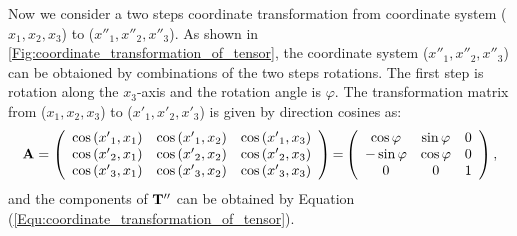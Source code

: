 Now we consider a two steps coordinate transformation from coordinate system ($x_1,x_2,x_3$) to ($x''_1,x''_2,x''_3$). As shown in \ref{Fig:coordinate_transformation_of_tensor}, the coordinate system ($x''_1,x''_2,x''_3$) can be obtaioned by combinations of the two steps rotations. The first step is rotation along the $x_3$-axis and the rotation angle is $\varphi$. The transformation matrix from ($x_1,x_2,x_3$) to ($x'_1,x'_2,x'_3$) is given by direction cosines as:
\begin{eqnarray}
{\bf{A}} = \left( {\begin{array}{*{20}{c}}
{\cos \left( {{{x'}_1},{x_1}} \right)}&{\cos \left( {{{x'}_1},{x_2}} \right)}&{\cos \left( {{{x'}_1},{x_3}} \right)}\\
{\cos \left( {{{x'}_2},{x_1}} \right)}&{\cos \left( {{{x'}_2},{x_2}} \right)}&{\cos \left( {{{x'}_2},{x_3}} \right)}\\
{\cos \left( {{{x'}_3},{x_1}} \right)}&{\cos \left( {{{x'}_3},{x_2}} \right)}&{\cos \left( {{{x'}_3},{x_3}} \right)}
\end{array}} \right){\rm{ = }}\left( {\begin{array}{*{20}{c}}
{\cos \varphi }&{\sin \varphi }&0\\
{ - \sin \varphi }&{\cos \varphi }&0\\
0&0&1
\end{array}} \right),
\end{eqnarray}
and the components of ${\bf{T''}}$ can be obtained by Equation (\ref{Equ:coordinate_transformation_of_tensor}).


